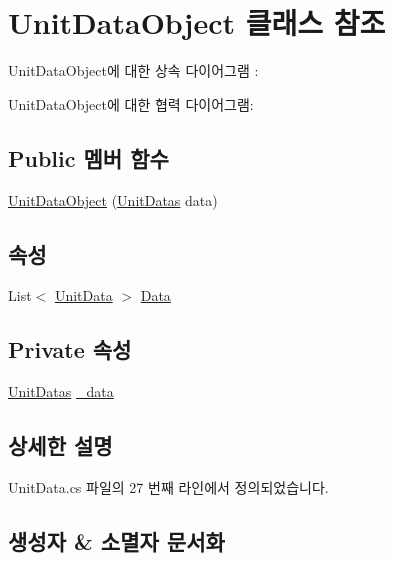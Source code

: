 \hypertarget{class_unit_data_object}{}\section{Unit\+Data\+Object 클래스 참조}
\label{class_unit_data_object}


Unit\+Data\+Object에 대한 상속 다이어그램 \+: 


Unit\+Data\+Object에 대한 협력 다이어그램\+:
\subsection*{Public 멤버 함수}
\begin{DoxyCompactItemize}
\item 
\hyperlink{class_unit_data_object_a011e961a53a6e278caaa7ef60f393356}{Unit\+Data\+Object} (\hyperlink{class_unit_datas}{Unit\+Datas} data)
\end{DoxyCompactItemize}
\subsection*{속성}
\begin{DoxyCompactItemize}
\item 
List$<$ \hyperlink{class_unit_data}{Unit\+Data} $>$ \hyperlink{class_unit_data_object_a91bcbabf21e310c89dce5a88fe8e482f}{Data}
\end{DoxyCompactItemize}
\subsection*{Private 속성}
\begin{DoxyCompactItemize}
\item 
\hyperlink{class_unit_datas}{Unit\+Datas} \hyperlink{class_unit_data_object_aa18d9577f22b44c4f3398e30ef0689ee}{\+\_\+data}
\end{DoxyCompactItemize}


\subsection{상세한 설명}


Unit\+Data.\+cs 파일의 27 번째 라인에서 정의되었습니다.



\subsection{생성자 \& 소멸자 문서화}
